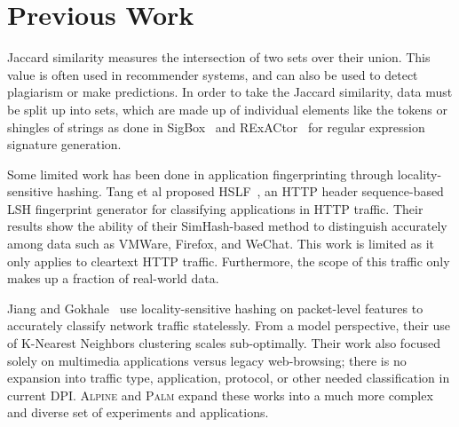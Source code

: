 \section{Previous Work}

Jaccard similarity measures the intersection of two sets over their union. This value is often used in recommender systems, and can also be used to detect plagiarism or make predictions. In order to take the Jaccard similarity, data must be split up into sets, which are made up of individual elements like the tokens or shingles of strings as done in SigBox~\cite{sigbox} and RExACtor~\cite{rexactor} for regular expression signature generation.

Some limited work has been done in application fingerprinting through locality-sensitive hashing. Tang et al proposed HSLF~\cite{hslf}, an HTTP header sequence-based LSH fingerprint generator for classifying applications in HTTP traffic. Their results show the ability of their SimHash-based method to distinguish accurately among data such as VMWare, Firefox, and WeChat. This work is limited as it only applies to cleartext HTTP traffic. Furthermore, the scope of this traffic only makes up a fraction of real-world data.


Jiang and Gokhale~\cite{fpga} use locality-sensitive hashing on packet-level features to accurately classify network traffic statelessly. From a model perspective, their use of K-Nearest Neighbors clustering scales sub-optimally. Their work also focused solely on multimedia applications versus legacy web-browsing; there is no expansion into traffic type, application, protocol, or other needed classification in current DPI. \textsc{Alpine} and \textsc{Palm} expand these works into a much more complex and diverse set of experiments and applications. 

